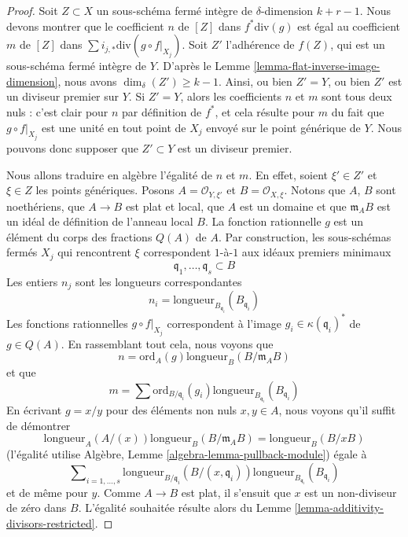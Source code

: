 \begin{proof}
Soit $Z \subset X$ un sous-schéma fermé intègre de $\delta$-dimension
$k + r - 1$. Nous devons montrer que le coefficient $n$ de $[Z]$ dans
$f^*\text{div}(g)$ est égal au coefficient
$m$ de $[Z]$ dans $\sum i_{j, *} \text{div}(g \circ f|_{X_j})$.
Soit $Z'$ l'adhérence de $f(Z)$, qui est un sous-schéma fermé
intègre de $Y$. D'après le Lemme \ref{lemma-flat-inverse-image-dimension},
nous avons $\dim_\delta(Z') \geq k - 1$. Ainsi, ou bien $Z' = Y$,
ou bien $Z'$ est un diviseur premier sur $Y$. Si $Z' = Y$, alors les coefficients
$n$ et $m$ sont tous deux nuls : c'est clair pour $n$ par définition
de $f^*$, et cela résulte pour $m$ du fait que $g \circ f|_{X_j}$ est
une unité en tout point de $X_j$ envoyé sur le point générique de $Y$.
Nous pouvons donc supposer que $Z' \subset Y$ est un diviseur premier.

\medskip\noindent
Nous allons traduire en algèbre l'égalité de $n$ et $m$.
En effet, soient $\xi' \in Z'$ et $\xi \in Z$ les points génériques.
Posons $A = \mathcal{O}_{Y, \xi'}$ et $B = \mathcal{O}_{X, \xi}$.
Notons que $A$, $B$ sont noethériens, que $A \to B$ est plat et local,
que $A$ est un domaine et que $\mathfrak m_AB$ est un idéal de définition
de l'anneau local $B$. La fonction rationnelle $g$ est un élément
du corps des fractions $Q(A)$ de $A$.
Par construction, les sous-schémas fermés $X_j$
qui rencontrent $\xi$ correspondent $1$-à-$1$ aux idéaux premiers minimaux
$$
\mathfrak q_1, \ldots, \mathfrak q_s \subset B
$$
Les entiers $n_j$ sont les longueurs correspondantes
$$
n_i = \text{longueur}_{B_{\mathfrak q_i}}(B_{\mathfrak q_i})
$$
Les fonctions rationnelles $g \circ f|_{X_j}$ correspondent à l'image
$g_i \in \kappa(\mathfrak q_i)^*$ de $g \in Q(A)$.
En rassemblant tout cela, nous voyons que
$$
n = \text{ord}_A(g) \text{longueur}_B(B/\mathfrak m_AB)
$$
et que
$$
m = \sum \text{ord}_{B/\mathfrak q_i}(g_i)
\text{longueur}_{B_{\mathfrak q_i}}(B_{\mathfrak q_i})
$$
En écrivant $g = x/y$ pour des éléments non nuls $x, y \in A$, nous voyons qu'il suffit
de démontrer
$$
\text{longueur}_A(A/(x)) \text{longueur}_B(B/\mathfrak m_AB) =
\text{longueur}_B(B/xB)
$$
(l'égalité utilise Algèbre, Lemme \ref{algebra-lemma-pullback-module})
égale à
$$
\sum\nolimits_{i = 1, \ldots, s}
\text{longueur}_{B/\mathfrak q_i}(B/(x, \mathfrak q_i))
\text{longueur}_{B_{\mathfrak q_i}}(B_{\mathfrak q_i})
$$
et de même pour $y$. Comme $A \to B$ est plat, il s'ensuit que $x$
est un non-diviseur de zéro dans $B$. L'égalité souhaitée résulte alors du
Lemme \ref{lemma-additivity-divisors-restricted}.
\end{proof}

